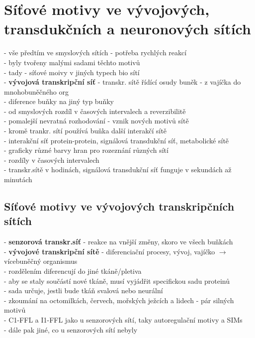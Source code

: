 \documentclass[11pt,a4paper]{report}
\begin{document}
\chapter{Síťové motivy ve vývojových, transdukčních a neuronových sítích}
- vše předtím ve smyslových sítích - potřeba rychlých reakcí\\
- byly tvořeny malými sadami těchto motivů\\
- tady - síťové moivy v jiných typech bio sítí\\
- \textbf{vývojová transkripční síť} - transkr. sítě řídící osudy buněk - z vajíčka do mnohobuněčného org\\
\indent - diference buňky na jiný typ buňky\\
\indent - od smyslových rozdíl v časových intervalech a reverzibilitě\\
\indent \indent - pomalejší nevratná rozhodování - vznik nových motivů sítě\\
- kromě trankr. sítí používá buňka další interakčí sítě\\
\indent - interakční síť protein-protein, signálová transdukční síť, metabolické sítě\\
\indent \indent - graficky různé barvy hran pro rozeznání různých sítí\\
\indent \indent - rozdíly v časových intervalech\\
\indent \indent \indent - transkr.sítě v hodinách, signálová transdukční síť funguje v sekundách až minutách\\

\section{Síťové motivy ve vývojových transkripčních sítích}
- \textbf{senzorová transkr.síť} - reakce na vnější změny, skoro ve všech buňkách\\
- \textbf{vývojové transkripční sítě} - diferenciační procesy, vývoj, vajíčko $\rightarrow$ vícebuněčný organismus\\
\indent - rozdělením diferencují do jiné tkáně/pletiva\\
\indent \indent - aby se staly součástí nové tkáně, musí vyjádřit specifickou sadu proteinů\\
\indent \indent \indent - sada určuje, jestli bude tkáň svalová nebo neurální\\
\indent - zkoumání na octomilkách, červech, mořských ježcích a lidech - pár silných motivů\\
\indent \indent - C1-FFL a I1-FFL jako u senzorových sítí, taky autoregulační motivy a SIMs\\
\indent \indent - dále pak jiné, co u senzorových sítí nebyly\\
\end{document}
